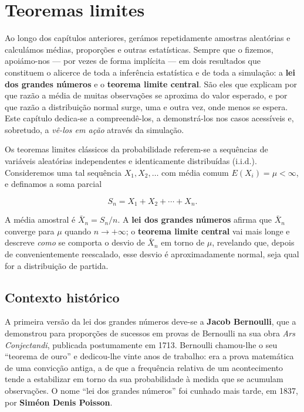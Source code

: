 \documentclass[
  portuguese,
  11pt,
  openany]{book}
\begin{document}
\chapter{Teoremas limites}\label{teoremas-limites}

Ao longo dos capítulos anteriores, gerámos repetidamente amostras aleatórias e
calculámos médias, proporções e outras estatísticas. Sempre que o fizemos,
apoiámo-nos --- por vezes de forma implícita --- em dois resultados que constituem
o alicerce de toda a inferência estatística e de toda a simulação: a \textbf{lei dos
grandes números} e o \textbf{teorema limite central}. São eles que explicam por que
razão a média de muitas observações se aproxima do valor esperado, e por que
razão a distribuição normal surge, uma e outra vez, onde menos se espera. Este
capítulo dedica-se a compreendê-los, a demonstrá-los nos casos acessíveis e,
sobretudo, a \emph{vê-los em ação} através da simulação.

Os teoremas limites clássicos da probabilidade referem-se a sequências de
variáveis aleatórias independentes e identicamente distribuídas (i.i.d.).
Consideremos uma tal sequência \(X_1, X_2, \ldots\) com média comum
\(E(X_i) = \mu < \infty\), e definamos a soma parcial

\[
S_n = X_1 + X_2 + \cdots + X_n.
\]

A média amostral é \(\bar{X}_n = S_n / n\). A \textbf{lei dos grandes números} afirma
que \(\bar{X}_n\) converge para \(\mu\) quando \(n \to +\infty\); o \textbf{teorema limite
central} vai mais longe e descreve \emph{como} se comporta o desvio de \(\bar{X}_n\)
em torno de \(\mu\), revelando que, depois de convenientemente reescalado, esse
desvio é aproximadamente normal, seja qual for a distribuição de partida.

\section{Contexto histórico}\label{contexto-histuxf3rico-1}

A primeira versão da lei dos grandes números deve-se a \textbf{Jacob Bernoulli}, que
a demonstrou para proporções de sucessos em provas de Bernoulli na sua obra
\emph{Ars Conjectandi}, publicada postumamente em 1713. Bernoulli chamou-lhe o seu
``teorema de ouro'' e dedicou-lhe vinte anos de trabalho: era a prova matemática
de uma convicção antiga, a de que a frequência relativa de um acontecimento
tende a estabilizar em torno da sua probabilidade à medida que se acumulam
observações. O nome ``lei dos grandes números'' foi cunhado mais tarde, em 1837,
por \textbf{Siméon Denis Poisson}.
\end{document}
